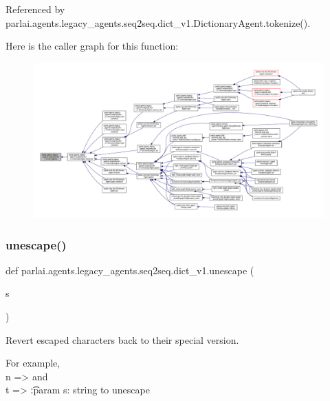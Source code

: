 Referenced by parlai.\+agents.\+legacy\+\_\+agents.\+seq2seq.\+dict\+\_\+v1.\+Dictionary\+Agent.\+tokenize().

Here is the caller graph for this function\+:
\nopagebreak
\begin{figure}[H]
\begin{center}
\leavevmode
\includegraphics[width=350pt]{namespaceparlai_1_1agents_1_1legacy__agents_1_1seq2seq_1_1dict__v1_ac37e7654855b4cdf9b8a6cb1a2193a17_icgraph}
\end{center}
\end{figure}
\mbox{\label{namespaceparlai_1_1agents_1_1legacy__agents_1_1seq2seq_1_1dict__v1_affad139ddec76996dc9a93f6123d545e}} 
\subsubsection{\texorpdfstring{unescape()}{unescape()}}
{\footnotesize\ttfamily def parlai.\+agents.\+legacy\+\_\+agents.\+seq2seq.\+dict\+\_\+v1.\+unescape (\begin{DoxyParamCaption}\item[{}]{s }\end{DoxyParamCaption})}

\begin{DoxyVerb}Revert escaped characters back to their special version.

For example, \\n => \n and \\t => \t

:param s: string to unescape
\end{DoxyVerb}
 

